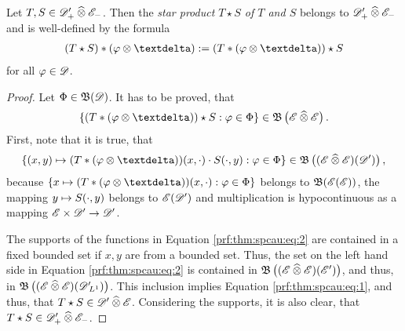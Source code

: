 \begin{theorem}
    \label{thm:spcau}
    Let $ T,S \in \mathscr{  D  }'_+ \mathbin{\widehat{\otimes}} \mathscr{  E  }_- $.
    Then the {\em star product $ T \star S $ of $ T $ and $ S $}
    belongs to $ \mathscr{  D  }'_+ \mathbin{\widehat{\otimes}} \mathscr{  E  }_- $
    and is well-defined by the formula
    \begin{align}
        ( T \star S ) * ( \ph \tepro \sfdeo )
        :=
        ( T * ( \ph \tepro \sfdeo ) ) \star S
        \label{thm:spcau:eq}
    \end{align}
    for all $ \varphi \in \mathscr{  D  } $.
\end{theorem}
\begin{proof}
    Let $ \Phi \in \operatorname{\mathfrak{ B }}(\mathscr{  D  }) $.
    It has to be proved, that
    \begin{align}
        \BrmSet{ ( T * ( \ph \tepro \sfdeo ) ) \star S }{ \ph \in \Ph }
        \in
        \ssBnd\left( \fsSmo \ctepro \fsSmo \right)
        .
        \label{prf:thm:spcau:eq:1}
    \end{align}
    First, note that it is true, that
    \begin{align}
        \BrmSet{ (x,y) \mto ( T * ( \ph \tepro \sfdeo ) )(x,\cdot) \mult S(\cdot,y) }
        { \ph \in \Ph }
        \in
        \ssBnd\left( ( \fsSmo \ctepro \fsSmo )( \fsDis ) \right)
        ,
        \label{prf:thm:spcau:eq:2}
    \end{align}
    because
    $ \BrmSet{ x \mto ( T * ( \ph \tepro \sfdeo ) )(x,\cdot) }{ \ph \in \Ph } $
    belongs to $ \operatorname{\mathfrak{ B }}( \mathscr{  E  }( \mathscr{  E  } ) ) $,
    the mapping $ y \mapsto S(\cdot,y) $ belongs to $ \mathscr{  E  }( \mathscr{  D  }' ) $ and
    multiplication is hypocontinuous
    as a mapping $ \mathscr{  E  } \times \mathscr{  D  }' \to \mathscr{  D  }' $.

    The supports of the functions in Equation \eqref{prf:thm:spcau:eq:2}
    are contained in a fixed bounded set
    if $ x,y $ are from a bounded set.
    Thus, the set on the left hand side
    in Equation \eqref{prf:thm:spcau:eq:2} is contained
    in $ \operatorname{\mathfrak{ B }}\left( ( \mathscr{  E  } \mathbin{\widehat{\otimes}} \mathscr{  E  } )( \mathscr{  E  }' ) \right) $,
    and thus, in $ \operatorname{\mathfrak{ B }}\left( ( \mathscr{  E  } \mathbin{\widehat{\otimes}} \mathscr{  E  } )( \mathscr{  D  }'\hspace{-2pt}{}_{ L^{ 1 } } ) \right) $.
    This inclusion implies Equation \eqref{prf:thm:spcau:eq:1},
    and thus, that $ T \star S \in \mathscr{  D  }' \mathbin{\widehat{\otimes}} \mathscr{  E  } $.
    Considering the supports, it is also clear,
    that $ T \star S \in \mathscr{  D  }'_+ \mathbin{\widehat{\otimes}} \mathscr{  E  }_- $.
\end{proof}


\newpage

